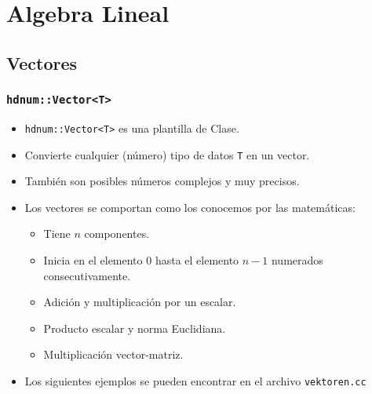 \documentclass[a4paper,11pt]{article}
\theoremstyle{definition}
\begin{document}
\section{Algebra Lineal}

\subsection{Vectores}

\begin{frame}[fragile]
\frametitle{\lstinline{hdnum::Vector<T>}}
\begin{itemize}
\item \lstinline{hdnum::Vector<T>} es una plantilla de Clase.
\item Convierte cualquier (número)  tipo de datos \lstinline{T} en un vector. 
\item También son posibles números complejos y muy precisos.
\item Los vectores se comportan como los conocemos por las matemáticas:
\begin{itemize}
\item Tiene $n$ componentes.
\item Inicia en el elemento $0$ hasta el elemento $n-1$ numerados consecutivamente.
\item Adición y multiplicación por un escalar.
\item Producto escalar y norma Euclidiana.
\item Multiplicación vector-matriz.
\end{itemize}
\item Los siguientes ejemplos se pueden encontrar en el archivo \lstinline{vektoren.cc}
\end{itemize}
\end{frame}
\end{document}
